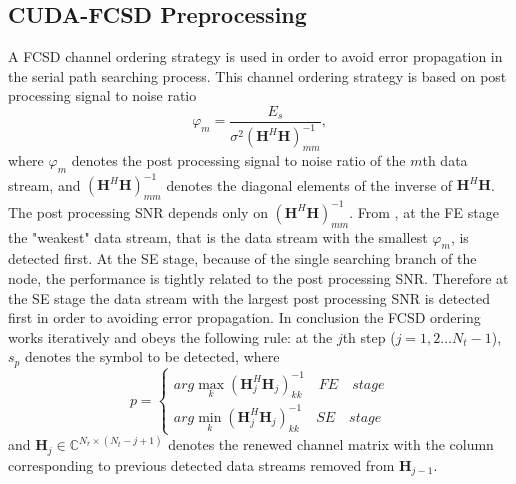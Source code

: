 \documentclass[letterpaper, 10pt, conference]{ieeeconf}
\begin{document}
\subsection{CUDA-FCSD Preprocessing}
A FCSD channel ordering strategy is used in order to avoid error propagation in the serial path searching process. This channel ordering strategy is based on post processing signal to noise ratio\cite{wolniansky1998v}
\begin{equation}
\varphi_{m}=\frac{E_{s}}{\sigma^{2}(\mathbf{H}^{H}\mathbf{H})_{mm}^{-1}},  \label{ppsnr}
\end{equation}
where $\varphi_{m}$ denotes the post processing signal to noise ratio of the $m$th data stream, and $(\mathbf{H}^{H}\mathbf{H})_{mm}^{-1}$ denotes the diagonal elements of the inverse of $\mathbf{H}^{H}\mathbf{H}$. The post processing SNR depends only on $(\mathbf{H}^{H}\mathbf{H})_{mm}^{-1}$. From \cite{barbero2008fixing}, at the FE stage the "weakest" data stream, that is the data stream with the smallest $\varphi_{m}$, is detected first. At the SE stage, because of the single searching branch of the node, the performance is tightly related to the post processing SNR. Therefore at the SE stage the data stream with the largest post processing SNR is detected first in order to avoiding error propagation. In conclusion the FCSD ordering works iteratively  and obeys the following rule:
at the $j$th step ($j=1,2\dots N_{t}-1$), $s_{p}$ denotes the symbol to be detected, where 
\begin{equation}
p=\left\lbrace \begin{array}{c}
arg\max_{k}(\mathbf{H}_{j}^{H}\mathbf{H}_{j})_{kk}^{-1}\quad FE\quad stage\\
arg\min_{k}(\mathbf{H}_{j}^{H}\mathbf{H}_{j})_{kk}^{-1}\quad SE\quad stage   \label{the ordering}
\end{array}\right.  
\end{equation}  
and $\mathbf{H}_{j}\in \mathbb{C}^{N_{r}\times (N_{t}-j+1)}$ denotes the renewed channel matrix with the column corresponding to previous detected data streams removed from $\mathbf{H}_{j-1}$.
\end{document}
